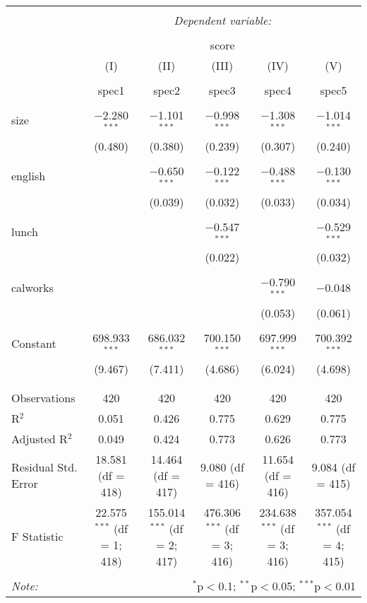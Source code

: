\documentclass[]{book}
\theoremstyle{definition}
\theoremstyle{definition}
\theoremstyle{definition}
\theoremstyle{remark}
\begin{document}
\begin{sidewaystable}[!htbp] \centering 
  \caption{} 
  \label{} 
\begin{tabular}{@{\extracolsep{5pt}}lccccc} 
\\[-1.8ex]\hline 
\hline \\[-1.8ex] 
 & \multicolumn{5}{c}{\textit{Dependent variable:}} \\ 
\cline{2-6} 
\\[-1.8ex] & \multicolumn{5}{c}{score} \\ 
 & (I) & (II) & (III) & (IV) & (V) \\ 
\\[-1.8ex] & spec1 & spec2 & spec3 & spec4 & spec5\\ 
\hline \\[-1.8ex] 
 size & $-$2.280$^{***}$ & $-$1.101$^{***}$ & $-$0.998$^{***}$ & $-$1.308$^{***}$ & $-$1.014$^{***}$ \\ 
  & (0.480) & (0.380) & (0.239) & (0.307) & (0.240) \\ 
  & & & & & \\ 
 english &  & $-$0.650$^{***}$ & $-$0.122$^{***}$ & $-$0.488$^{***}$ & $-$0.130$^{***}$ \\ 
  &  & (0.039) & (0.032) & (0.033) & (0.034) \\ 
  & & & & & \\ 
 lunch &  &  & $-$0.547$^{***}$ &  & $-$0.529$^{***}$ \\ 
  &  &  & (0.022) &  & (0.032) \\ 
  & & & & & \\ 
 calworks &  &  &  & $-$0.790$^{***}$ & $-$0.048 \\ 
  &  &  &  & (0.053) & (0.061) \\ 
  & & & & & \\ 
 Constant & 698.933$^{***}$ & 686.032$^{***}$ & 700.150$^{***}$ & 697.999$^{***}$ & 700.392$^{***}$ \\ 
  & (9.467) & (7.411) & (4.686) & (6.024) & (4.698) \\ 
  & & & & & \\ 
\hline \\[-1.8ex] 
Observations & 420 & 420 & 420 & 420 & 420 \\ 
R$^{2}$ & 0.051 & 0.426 & 0.775 & 0.629 & 0.775 \\ 
Adjusted R$^{2}$ & 0.049 & 0.424 & 0.773 & 0.626 & 0.773 \\ 
Residual Std. Error & 18.581 (df = 418) & 14.464 (df = 417) & 9.080 (df = 416) & 11.654 (df = 416) & 9.084 (df = 415) \\ 
F Statistic & 22.575$^{***}$ (df = 1; 418) & 155.014$^{***}$ (df = 2; 417) & 476.306$^{***}$ (df = 3; 416) & 234.638$^{***}$ (df = 3; 416) & 357.054$^{***}$ (df = 4; 415) \\ 
\hline 
\hline \\[-1.8ex] 
\textit{Note:}  & \multicolumn{5}{r}{$^{*}$p$<$0.1; $^{**}$p$<$0.05; $^{***}$p$<$0.01} \\ 
\end{tabular} 
\end{sidewaystable}
\end{document}
